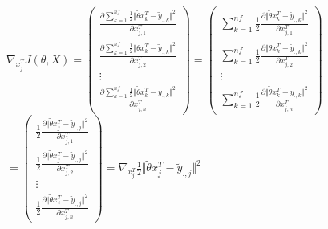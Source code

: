 \documentclass[a4paper,10pt]{article}
\begin{document}
\subsection{} 
\label{P1} 
$\nabla_{x_{j}^T} J(\theta, X)= 
\begin{pmatrix} 
\displaystyle\frac{\partial \displaystyle\sum_{k=1}^{nf}\frac{1}{2}\Vert\tilde{\theta}x_{k}^{T}-\tilde{y}_{.,k}\Vert^{2}}{\partial x_{j,1}^{T}}\\ 
\displaystyle\frac{\partial \displaystyle\sum_{k=1}^{nf}\frac{1}{2}\Vert\tilde{\theta}x_{k}^{T}-\tilde{y}_{.,k}\Vert^{2}}{\partial x_{j,2}^{T}}\\ 
\vdots\\ 
\displaystyle\frac{\partial \displaystyle\sum_{k=1}^{nf}\frac{1}{2}\Vert\tilde{\theta}x_{k}^{T}-\tilde{y}_{.,k}\Vert^{2}}{\partial x_{j,n}^{T}} 
\end{pmatrix} 
= 
\begin{pmatrix} 
\displaystyle\sum_{k=1}^{nf} 
\frac{1}{2}\frac{\partial\Vert\tilde{\theta}x_{k}^{T}-\tilde{y}_{.,k}\Vert^{2}}{\partial x_{j,1}^{T}}\\ 
\displaystyle\sum_{k=1}^{nf} 
\frac{1}{2}\frac{\partial\Vert\tilde{\theta}x_{k}^{T}-\tilde{y}_{.,k}\Vert^{2}}{\partial x_{j,2}^{T}}\\ 
\vdots\\ 
\displaystyle\sum_{k=1}^{nf} 
\frac{1}{2}\frac{\partial\Vert\tilde{\theta}x_{k}^{T}-\tilde{y}_{.,k}\Vert^{2}}{\partial x_{j,n}^{T}} 
\end{pmatrix}$\\ 
$ 
= 
\begin{pmatrix} 
\displaystyle 
\frac{1}{2}\frac{\partial\Vert\tilde{\theta}x_{j}^{T}-\tilde{y}_{.,j}\Vert^{2}}{\partial x_{j,1}^{T}}\\ 
\displaystyle 
\frac{1}{2}\frac{\partial\Vert\tilde{\theta}x_{j}^{T}-\tilde{y}_{.,j}\Vert^{2}}{\partial x_{j,2}^{T}}\\ 
\vdots\\ 
\displaystyle 
\frac{1}{2}\frac{\partial\Vert\tilde{\theta}x_{j}^{T}-\tilde{y}_{.,j}\Vert^{2}}{\partial x_{j,n}^{T}} 
\end{pmatrix} 
= 
\displaystyle 
\nabla_{x_{j}^T}\frac{1}{2}\Vert\tilde{\theta}x_{j}^{T}-\tilde{y}_{.,j}\Vert^{2} 
$ 
\end{document}
